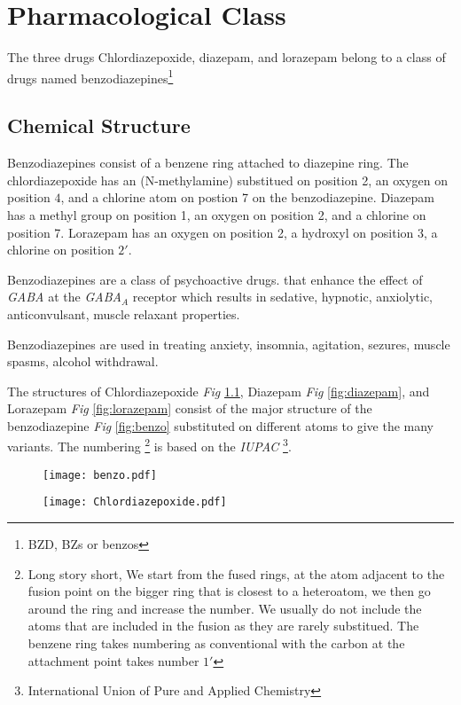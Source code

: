 \chapter{Pharmacological Class}
The three drugs Chlordiazepoxide, diazepam, and lorazepam belong to a class of drugs named benzodiazepines\footnote{BZD, BZs or benzos}

\section{Chemical Structure}
Benzodiazepines consist of a benzene ring attached to diazepine ring.
The chlordiazepoxide has an (N-methylamine) substitued on position 2, an oxygen on position $4$, and a chlorine atom on postion 7 on the benzodiazepine.
Diazepam has a methyl group on position 1, an oxygen on position 2, and a chlorine on position 7.
Lorazepam has an oxygen on position 2, a hydroxyl on position 3, a chlorine on position $2'$.

Benzodiazepines are a class of psychoactive drugs. that enhance the effect of \emph{\uppercase{gaba}} at the \emph{GABA$_A$} receptor which results in sedative, hypnotic, anxiolytic, anticonvulsant, muscle relaxant properties.

Benzodiazepines are used in treating anxiety, insomnia, agitation, sezures, muscle spasms, alcohol withdrawal.\cite{}


The structures of Chlordiazepoxide \emph{Fig} \ref{fig:cldiazepoxide}, Diazepam \emph{Fig} \ref{fig:diazepam}, and Lorazepam \emph{Fig} \ref{fig:lorazepam} consist of the major structure of the benzodiazepine \emph{Fig} \ref{fig:benzo} substituted on different atoms to give the many variants. The numbering \footnote{Long story short, We start from the fused rings, at the atom adjacent to the fusion point on the bigger ring that is closest to a heteroatom, we then go around the ring and increase the number. We usually do not include the atoms that are included in the fusion as they are rarely substitued. The benzene ring takes numbering as conventional with the carbon at the attachment point takes number $1'$} is based on the \emph{IUPAC} \footnote{International Union of Pure and Applied Chemistry}.

	\begin{figure}
		\centering
		\begin{minipage}{.5\textwidth}
			\centering
			\texttt{[image: benzo.pdf]}
			\label{fig:benzo}
		\end{minipage}%
		\begin{minipage}{.5\textwidth}
			\centering
			\texttt{[image: Chlordiazepoxide.pdf]}
			\label{fig:cldiazepoxide}
		\end{minipage}
	\end{figure}

